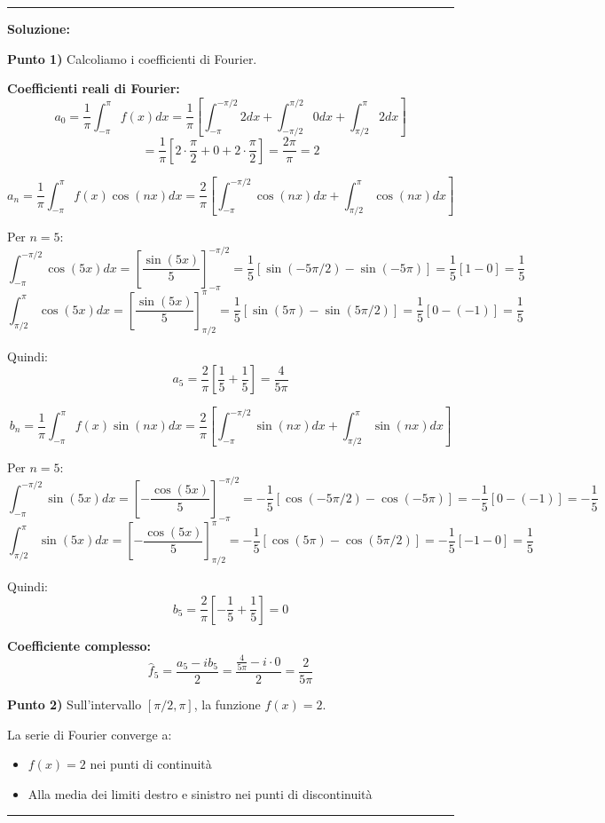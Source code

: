 \documentclass[12pt, a4paper]{article}
\newenvironment{solution}
{\par\noindent\rule{\textwidth}{0.4pt}\par\textbf{Soluzione:}\medskip\par}
{\par\rule{\textwidth}{0.4pt}\par\bigskip}
\begin{document}
\begin{solution}
\textbf{Punto 1)} Calcoliamo i coefficienti di Fourier.

\textbf{Coefficienti reali di Fourier:}
\[
a_0 = \frac{1}{\pi} \int_{-\pi}^{\pi} f(x) dx = \frac{1}{\pi} \left[\int_{-\pi}^{-\pi/2} 2 dx + \int_{-\pi/2}^{\pi/2} 0 dx + \int_{\pi/2}^{\pi} 2 dx\right]
\]
\[
= \frac{1}{\pi} \left[2 \cdot \frac{\pi}{2} + 0 + 2 \cdot \frac{\pi}{2}\right] = \frac{2\pi}{\pi} = 2
\]

\[
a_n = \frac{1}{\pi} \int_{-\pi}^{\pi} f(x) \cos(nx) dx = \frac{2}{\pi} \left[\int_{-\pi}^{-\pi/2} \cos(nx) dx + \int_{\pi/2}^{\pi} \cos(nx) dx\right]
\]

Per $n = 5$:
\[
\int_{-\pi}^{-\pi/2} \cos(5x) dx = \left[\frac{\sin(5x)}{5}\right]_{-\pi}^{-\pi/2} = \frac{1}{5}[\sin(-5\pi/2) - \sin(-5\pi)] = \frac{1}{5}[1 - 0] = \frac{1}{5}
\]
\[
\int_{\pi/2}^{\pi} \cos(5x) dx = \left[\frac{\sin(5x)}{5}\right]_{\pi/2}^{\pi} = \frac{1}{5}[\sin(5\pi) - \sin(5\pi/2)] = \frac{1}{5}[0 - (-1)] = \frac{1}{5}
\]

Quindi:
\[
a_5 = \frac{2}{\pi} \left[\frac{1}{5} + \frac{1}{5}\right] = \frac{4}{5\pi}
\]

\[
b_n = \frac{1}{\pi} \int_{-\pi}^{\pi} f(x) \sin(nx) dx = \frac{2}{\pi} \left[\int_{-\pi}^{-\pi/2} \sin(nx) dx + \int_{\pi/2}^{\pi} \sin(nx) dx\right]
\]

Per $n = 5$:
\[
\int_{-\pi}^{-\pi/2} \sin(5x) dx = \left[-\frac{\cos(5x)}{5}\right]_{-\pi}^{-\pi/2} = -\frac{1}{5}[\cos(-5\pi/2) - \cos(-5\pi)] = -\frac{1}{5}[0 - (-1)] = -\frac{1}{5}
\]
\[
\int_{\pi/2}^{\pi} \sin(5x) dx = \left[-\frac{\cos(5x)}{5}\right]_{\pi/2}^{\pi} = -\frac{1}{5}[\cos(5\pi) - \cos(5\pi/2)] = -\frac{1}{5}[-1 - 0] = \frac{1}{5}
\]

Quindi:
\[
b_5 = \frac{2}{\pi} \left[-\frac{1}{5} + \frac{1}{5}\right] = 0
\]

\textbf{Coefficiente complesso:}
\[
\hat{f}_5 = \frac{a_5 - ib_5}{2} = \frac{\frac{4}{5\pi} - i \cdot 0}{2} = \frac{2}{5\pi}
\]

\vspace{0.5cm}

\textbf{Punto 2)} Sull'intervallo $[\pi/2, \pi]$, la funzione $f(x) = 2$.

La serie di Fourier converge a:
\begin{itemize}
    \item $f(x) = 2$ nei punti di continuità
    \item Alla media dei limiti destro e sinistro nei punti di discontinuità
\end{itemize}


\end{solution}
\end{document}
